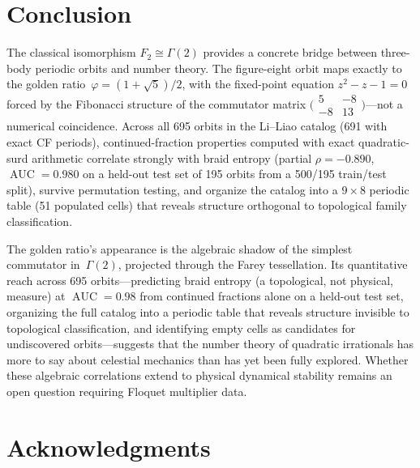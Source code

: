 \documentclass[11pt]{article}
\theoremstyle{definition}
\DeclareMathOperator{\AUC}{AUC}
\begin{document}
\section{Conclusion}\label{sec:conclusion}

The classical isomorphism $F_2 \cong \Gamma(2)$ provides a concrete
bridge between three-body periodic orbits and number theory.  The
figure-eight orbit maps exactly to the golden ratio~$\varphi =
(1+\sqrt{5})/2$, with the fixed-point equation $z^2 - z - 1 = 0$
forced by the Fibonacci structure of the commutator matrix
$\bigl(\begin{smallmatrix}5&-8\\-8&13\end{smallmatrix}\bigr)$---not
a numerical coincidence.  Across all 695 orbits in the Li--Liao
catalog (691 with exact CF periods), continued-fraction properties
computed with exact quadratic-surd arithmetic correlate strongly with
braid entropy (partial $\rho = -0.890$, $\AUC = 0.980$ on a held-out
test set of 195 orbits from a 500/195 train/test split), survive
permutation testing, and organize
the catalog into a $9 \times 8$ periodic table (51 populated cells)
that reveals structure orthogonal to topological family
classification.

The golden ratio's appearance is the algebraic shadow of the
simplest commutator in~$\Gamma(2)$, projected through the Farey
tessellation.  Its quantitative reach across 695 orbits---predicting
braid entropy (a topological, not physical, measure) at $\AUC = 0.98$
from continued fractions alone on a held-out test set,
organizing the full catalog into a periodic table that reveals
structure invisible to topological classification, and identifying
empty cells as candidates for undiscovered orbits---suggests that
the number theory of quadratic irrationals has more to say about
celestial mechanics than has yet been fully explored.  Whether these
algebraic correlations extend to physical dynamical stability remains
an open question requiring Floquet multiplier data.


\section*{Acknowledgments}
\end{document}
